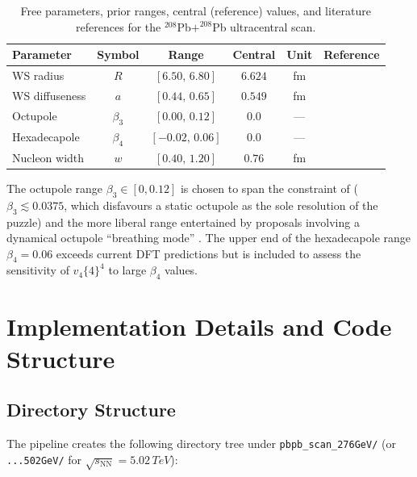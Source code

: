 \documentclass[12pt,a4paper,twoside]{report}
\newcommand{\PbPb}{$^{208}$Pb$+^{208}$Pb\xspace}
\newcommand{\sqrtsnn}{\sqrt{s_\mathrm{NN}}}
\begin{document}
\begin{table}[htbp]
\centering
\caption{Free parameters, prior ranges, central (reference) values,
  and literature references for the \PbPb ultracentral scan.}
\label{tab:prior_ranges}
\renewcommand{\arraystretch}{1.25}
\begin{tabular}{lccccl}
\toprule
Parameter & Symbol & Range & Central & Unit & Reference \\
\midrule
WS radius     & $R$      & $[6.50,\,6.80]$ & $6.624$ & fm & \cite{deVries1987} \\
WS diffuseness & $a$     & $[0.44,\,0.65]$ & $0.549$ & fm & \cite{deVries1987,PREX2021} \\
Octupole      & $\beta_3$ & $[0.00,\,0.12]$ & $0.0$ & — & \cite{Carzon2020,Xu2025} \\
Hexadecapole  & $\beta_4$ & $[-0.02,\,0.06]$ & $0.0$ & — & \cite{Bally2022} \\
Nucleon width & $w$      & $[0.40,\,1.20]$ & $0.76$ & fm & \cite{Bernhard2019} \\
\bottomrule
\end{tabular}
\end{table}

\noindent
The octupole range $\beta_3 \in [0, 0.12]$ is chosen to span the
constraint of \cite{Carzon2020} ($\beta_3 \lesssim 0.0375$, which
disfavours a static octupole as the sole resolution of the puzzle)
and the more liberal range entertained by proposals involving a
dynamical octupole ``breathing mode'' \cite{Xu2025}.  The upper end
of the hexadecapole range $\beta_4 = 0.06$ exceeds current DFT
predictions but is included to assess the sensitivity of $v_4\{4\}^4$
to large $\beta_4$ values.

\section{Implementation Details and Code Structure}
\label{sec:implementation}

\subsection{Directory Structure}
\label{subsec:dir_structure}

The pipeline creates the following directory tree under
\texttt{pbpb\_scan\_276GeV/} (or \texttt{...502GeV/}
for $\sqrtsnn = 5.02\,\si{TeV}$):
\end{document}
